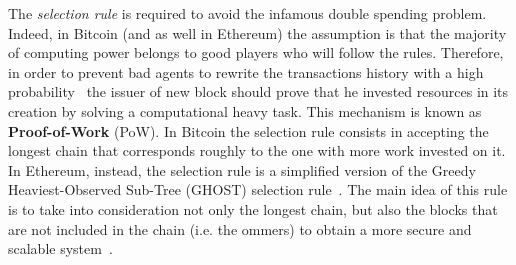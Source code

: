 The \emph{selection rule} is required to avoid the infamous double spending
problem. Indeed, in Bitcoin (and as well in Ethereum) the assumption is that the
majority of computing power belongs to good players who will follow the
rules. Therefore, in order to prevent bad agents
to rewrite the transactions history with a high probability~\cite{bib:bitcoin}
the issuer of new block should prove that he invested resources in its creation
by solving a computational heavy task. This mechanism is known as
\textbf{Proof-of-Work} (PoW). In Bitcoin the selection rule consists in
accepting the longest chain that corresponds roughly to the one with more work
invested on it. In Ethereum, instead, the selection rule is a simplified version
of the Greedy Heaviest-Observed Sub-Tree (GHOST) selection
rule~\cite{wood2018ethereum}. The main idea of this rule is to take into
consideration not only the longest chain, but also the blocks that are not
included in the chain (i.e. the ommers) to obtain a more secure and scalable
system~\cite{bib:ghost}.


